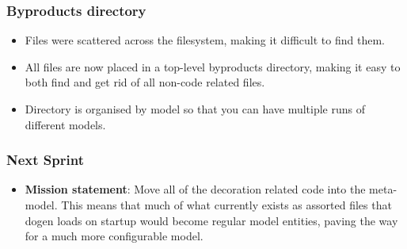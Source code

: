 \documentclass{beamer}
\begin{document}
\begin{frame}
\frametitle{Byproducts directory}

\begin{itemize}

\item Files were scattered across the filesystem, making it difficult
  to find them.

  \pause

\item All files are now placed in a top-level byproducts directory,
  making it easy to both find and get rid of all non-code related
  files.

  \pause

\item Directory is organised by model so that you can have multiple
  runs of different models.

\end{itemize}

\end{frame}

\begin{frame}
\frametitle{Next Sprint}

\begin{itemize}
\item \textbf{Mission statement}: Move all of the decoration related
  code into the meta-model. This means that much of what currently
  exists as assorted files that dogen loads on startup would become
  regular model entities, paving the way for a much more configurable
  model.
\end{itemize}

\end{frame}
\end{document}
